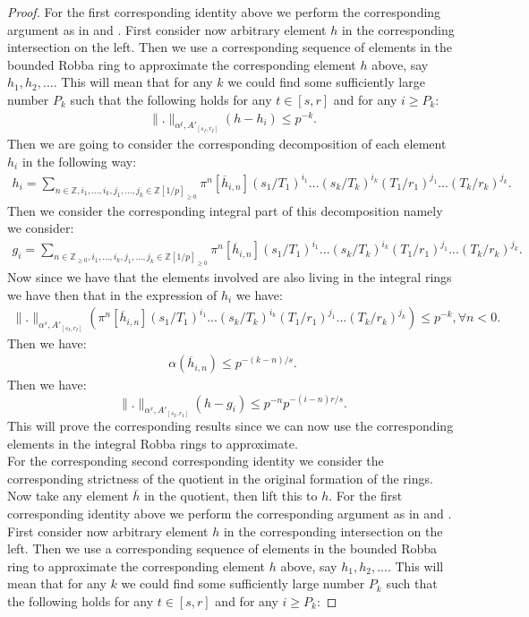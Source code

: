 \documentclass[12pt]{amsart}
\theoremstyle{definition}
\numberwithin{equation}{section}
\begin{document}
\begin{proof}
For the first corresponding identity above we perform the corresponding argument as in \cite[Lemma 5.2.6]{KL2} and \cite{T2}. First consider now arbitrary element $h$ in the corresponding intersection on the left. Then we use a corresponding sequence of elements in the bounded Robba ring to approximate the corresponding element $h$ above, say $h_1,h_2,...$. This will mean that for any $k$ we could find some sufficiently large number $P_k$ such that the following holds for any $t\in [s,r]$ and for any $i\geq P_k$:
\begin{align}
\|.\|_{\alpha^t,A'_{[s_I,r_I]}}(h-h_i)\leq p^{-k}.	
\end{align}
Then we are going to consider the corresponding decomposition of each element $h_i$ in the following way:
\begin{align}
h_i=\sum_{n\in \mathbb{Z},i_1,...,i_k,j_1,...,j_k\in \mathbb{Z}[1/p]_{\geq 0}}\pi^n[\overline{h}_{i,n}](s_1/T_1)^{i_1}...(s_k/T_k)^{i_k}(T_1/r_1)^{j_1}...(T_k/r_k)^{j_k}.	
\end{align}
Then we consider the corresponding integral part of this decomposition namely we consider:
\begin{align}
g_i=\sum_{n\in \mathbb{Z}_{\geq 0},i_1,...,i_k,j_1,...,j_k\in \mathbb{Z}[1/p]_{\geq 0}}\pi^n[\overline{h}_{i,n}](s_1/T_1)^{i_1}...(s_k/T_k)^{i_k}(T_1/r_1)^{j_1}...(T_k/r_k)^{j_k}.	
\end{align}
Now since we have that the elements involved are also living in the integral rings we have then that in the expression of $h_i$ we have:
\begin{align}
\|.\|_{\alpha^s,A'_{[s_I,r_I]}}(\pi^n[\overline{h}_{i,n}](s_1/T_1)^{i_1}...(s_k/T_k)^{i_k}(T_1/r_1)^{j_1}...(T_k/r_k)^{j_k})\leq p^{-k},\forall n<0.	
\end{align}
Then we have:
\begin{align}
{\alpha}(\overline{h}_{i,n})\leq p^{-(k-n)/s}.	
\end{align}
Then we have:
\begin{displaymath}
\|.\|_{\alpha^r,A'_{[s_I,r_I]}}(h-g_i)\leq p^{-n}p^{-(i-n)r/s}.	
\end{displaymath}
This will prove the corresponding results since we can now use the corresponding elements in the integral Robba rings to approximate.\\
For the corresponding second corresponding identity we consider the corresponding strictness of the quotient in the original formation of the rings. Now take any element $\overline{h}$ in the quotient, then lift this to $h$. For the first corresponding identity above we perform the corresponding argument as in \cite[Lemma 5.2.6]{KL2} and \cite{T2}. First consider now arbitrary element $h$ in the corresponding intersection on the left. Then we use a corresponding sequence of elements in the bounded Robba ring to approximate the corresponding element $h$ above, say $h_1,h_2,...$. This will mean that for any $k$ we could find some sufficiently large number $P_k$ such that the following holds for any $t\in [s,r]$ and for any $i\geq P_k$:

\end{proof}
\end{document}
